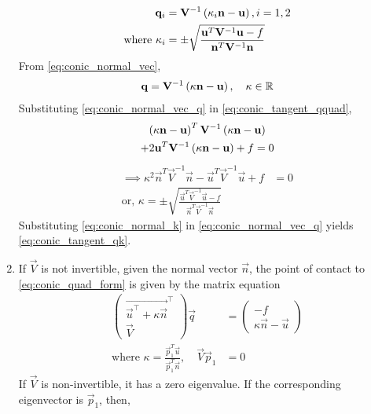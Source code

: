 \documentclass[journal,12pt,twocolumn]{IEEEtran}
\renewcommand\thesection{\arabic{section}}
\renewcommand\thesubsection{\thesection.\arabic{subsection}}
\begin{document}
\begin{enumerate}[label=\thesubsection.\arabic*.,ref=\thesubsection.\theenumi]
\begin{align}
  \begin{split}
\mathbf{q}_i &= \mathbf{V}^{-1}\left(\kappa_i \mathbf{n}-\mathbf{u}\right), i = 1,2
\\
\text{where }\kappa_i &= \pm \sqrt{
\frac{
\mathbf{u}^T\mathbf{V}^{-1}\mathbf{u}-f
}
{
\mathbf{n}^T\mathbf{V}^{-1}\mathbf{n}
}
}
  \end{split}
\label{eq:conic_tangent_qk}
\end{align}
\solution From \eqref{eq:conic_normal_vec},
\begin{align}
\label{eq:conic_normal_vec_q}
 \mathbf{q} = \mathbf{V}^{-1}\left(\kappa \mathbf{n}-\mathbf{u}\right), \quad \kappa \in \mathbb{R}
\end{align}
Substituting \eqref{eq:conic_normal_vec_q}
in \eqref{eq:conic_tangent_qquad},
\begin{multline}
\left(\kappa \mathbf{n}-\mathbf{u}\right)^T\mathbf{V}^{-1}\left(\kappa \mathbf{n}-\mathbf{u}\right) 
\\
+ 2\mathbf{u}^T\mathbf{V}^{-1}\left(\kappa \mathbf{n}-\mathbf{u}\right) +f = 0
\end{multline}
\begin{align}
\implies 
\kappa^2 \vec{n}^T\vec{V}^{-1}\vec{n} - \vec{u}^T\vec{V}^{-1}\vec{u} + f &=0
 \\
 \text{or, } \kappa = \pm \sqrt{\frac{\vec{u}^T\vec{V}^{-1}\vec{u}-f}{\vec{n}^T\vec{V}^{-1}\vec{n}}} &\label{eq:conic_normal_k}
\end{align}
%
Substituting \eqref{eq:conic_normal_k} in \eqref{eq:conic_normal_vec_q}
yields \eqref{eq:conic_tangent_qk}.
\item If $\vec{V}$ is not invertible,  given the normal vector $\vec{n}$, the point of contact to \eqref{eq:conic_quad_form} is given by the matrix equation
\begin{align}
\label{eq:conic_tangent_q_eigen}
\begin{pmatrix}
	\vec{\vec{u}^{\top}+\kappa \vec{n}}^{\top} \\ \vec{V}
\end{pmatrix}
\vec{q} &= 
\begin{pmatrix}
-f
\\
\kappa\vec{n}-\vec{u}
\end{pmatrix}
\\
\text{where }  \kappa = \frac{\vec{p}_1^T\vec{u}}{\vec{p}_1^T\vec{n}}, \quad \vec{V}\vec{p}_1 &= 0
\label{eq:conic_tangent_qk_eigen}
\end{align}
\solution 
  If $\vec{V}$ is non-invertible, it has a zero eigenvalue.  If the corresponding eigenvector is $\vec{p}_1$, then,

\end{enumerate}
\end{document}
